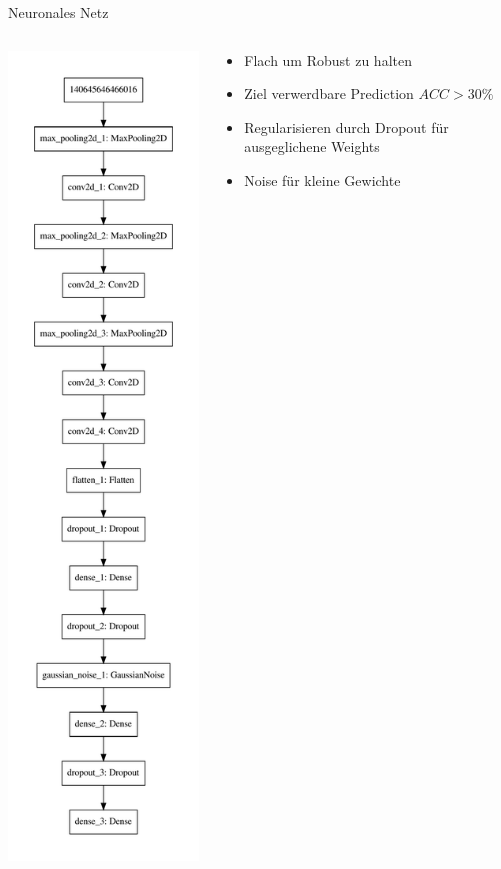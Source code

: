 \begin{frame}[t]{Neuronales Netz}
		\begin{columns}
				\begin{column}{0.5\textwidth}
						\centering
						\includegraphics[height=0.8\lineheight]{content/model.pdf}
				\end{column}
				\begin{column}{0.5\textwidth}
						\begin{itemize}
								\item Flach um Robust zu halten
								\item Ziel verwerdbare Prediction $ACC > 30 \%$
								\item Regularisieren durch Dropout für ausgeglichene Weights
								\item Noise für kleine Gewichte
						\end{itemize}


\end{column}
\end{columns}
\end{frame}
